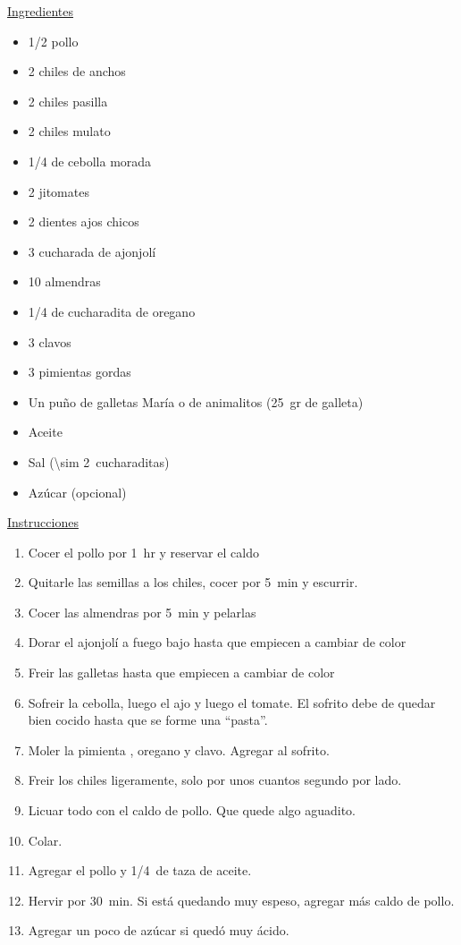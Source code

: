 \underline{Ingredientes}
\begin{itemize}
\item \num{1/2} pollo
\item 2 chiles de anchos
\item 2 chiles pasilla
\item 2 chiles mulato
\item \num{1/4} de cebolla morada
\item 2 jitomates
\item 2 dientes ajos chicos
\item 3 cucharada de ajonjolí
\item 10 almendras
\item \num{1/4} de cucharadita de oregano
\item 3 clavos
\item 3 pimientas gordas
\item Un puño de galletas María o de animalitos (\SI{25}{gr} de galleta)
\item Aceite
\item Sal (\SI{\sim 2}{cucharaditas})
\item Azúcar (opcional)
\end{itemize}

\underline{Instrucciones}
\begin{enumerate}
\item Cocer el pollo por \SI{1}{hr} y reservar el caldo
\item Quitarle las semillas a los chiles, cocer por \SI{5}{min} y escurrir.
\item Cocer las almendras por \SI{5}{min} y pelarlas
\item Dorar el ajonjolí a fuego bajo hasta que empiecen a cambiar de color
\item Freir las galletas hasta que empiecen a cambiar de color
\item Sofreir la cebolla, luego el ajo y luego el tomate. El sofrito debe de quedar bien cocido hasta que se forme una ``pasta''.
\item Moler la pimienta , oregano y clavo. Agregar al sofrito.
\item Freir los chiles ligeramente, solo por unos cuantos segundo por lado.
\item Licuar todo con el caldo de pollo. Que quede algo aguadito.
\item Colar.
\item Agregar el pollo y \SI{1/4}{de} taza de aceite.
\item Hervir por \SI{30}{min}. Si está quedando muy espeso, agregar más caldo de pollo.
\item Agregar un poco de azúcar si quedó muy ácido.
\end{enumerate}
